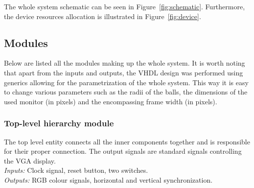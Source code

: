 \documentclass[11pt,a4paper]{article}
\begin{document}
        The whole system schematic can be seen in Figure~\ref{fig:schematic}. Furthermore, the device resources allocation is illustrated in Figure~\ref{fig:device}.

    \subsection*{Modules}
        Below are listed all the modules making up the whole system. It is worth noting that apart from the inputs and outputs, the VHDL design was performed using generics allowing for the parametrization of the whole system. This way it is easy to change various parameters such as the radii of the balls, the dimensions of the used monitor (in pixels) and the encompassing frame width (in pixels).

        \subsubsection*{Top-level hierarchy module}
            The top level entity connects all the inner components together and is responsible for their proper connection. The output signals are standard signals controlling the VGA display.\\[1em]
            \emph{Inputs:} Clock signal, reset button, two switches.\\[1em]
            \emph{Outputs:} RGB colour signals, horizontal and vertical synchronization.
\end{document}
